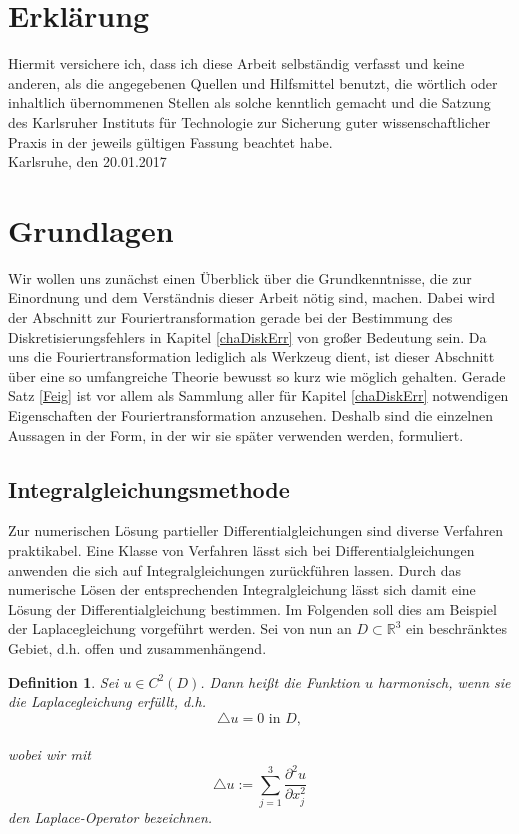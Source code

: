 \documentclass[12pt,a4paper]{scrartcl}
\newtheorem{Def}[Satz]{Definition}
\numberwithin{equation}{section}
\newcommand{\R}{\mathbb{R}} %
\newcommand{\laplace}{\bigtriangleup}
\begin{document}
\section*{Erklärung}

Hiermit versichere ich, dass ich diese Arbeit selbständig verfasst und keine anderen, als die angegebenen Quellen und Hilfsmittel benutzt, die wörtlich oder inhaltlich übernommenen Stellen als solche kenntlich gemacht und die Satzung des Karlsruher Instituts für Technologie zur Sicherung guter wissenschaftlicher Praxis in der jeweils gültigen Fassung beachtet habe. \\[2ex] 

\noindent
Karlsruhe, den 20.01.2017\\[5ex]



\newpage

\section{Grundlagen}
Wir wollen uns zunächst einen Überblick über die Grundkenntnisse, die zur Einordnung und dem Verständnis dieser Arbeit nötig sind, machen. Dabei wird der Abschnitt zur Fouriertransformation gerade bei der Bestimmung des Diskretisierungsfehlers in Kapitel \ref{chaDiskErr} von großer Bedeutung sein. Da uns die Fouriertransformation lediglich als Werkzeug dient, ist dieser Abschnitt über eine so umfangreiche Theorie bewusst so kurz wie möglich gehalten. Gerade Satz \ref{Feig} ist vor allem als Sammlung aller für Kapitel \ref{chaDiskErr} notwendigen Eigenschaften der Fouriertransformation anzusehen. Deshalb sind die einzelnen Aussagen in der Form, in der wir sie später verwenden werden, formuliert. 

\subsection{Integralgleichungsmethode} \label{Intmethode}
Zur numerischen Lösung partieller Differentialgleichungen sind diverse Verfahren praktikabel. Eine Klasse von Verfahren lässt sich bei Differentialgleichungen anwenden die sich auf Integralgleichungen zurückführen lassen. Durch das numerische Lösen der entsprechenden Integralgleichung lässt sich damit eine Lösung der Differentialgleichung bestimmen. Im Folgenden soll dies am Beispiel der Laplacegleichung vorgeführt werden. 
Sei von nun an $D \subset \R^3$ ein beschränktes Gebiet, d.h. offen und zusammenhängend.
\begin{Def}
	Sei $u\in C^2(D)$. Dann heißt die Funktion $u$ \emph{harmonisch}, wenn sie die Laplacegleichung erfüllt, d.h.
	\[
		\laplace u = 0 \text{ in } D,
	\]
	\\
	wobei wir mit
	\[
		\laplace u := \sum_{j=1}^3 \frac{\partial^2 u}{\partial x_j^2}
	\]
	den Laplace-Operator bezeichnen.
	
\end{Def}
\end{document}

